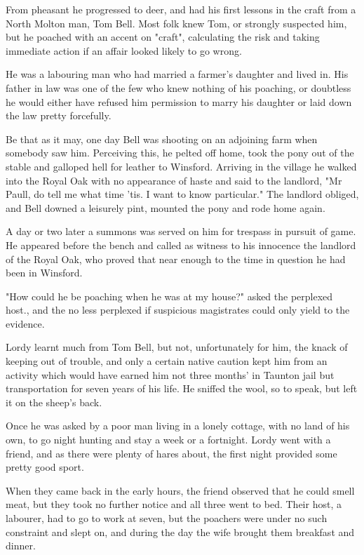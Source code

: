 From pheasant he progressed to deer, and had his first lessons in the craft from a North Molton man, Tom Bell. Most folk knew Tom, or strongly suspected him, but he poached with an accent on "craft", calculating the risk and taking immediate action if an affair looked likely to go wrong.

He was a labouring man who had married a farmer's daughter and lived in. His father in law was one of the few who knew nothing of his poaching, or doubtless he would either have refused him permission to marry his daughter or laid down the law pretty forcefully.

Be that as it may, one day Bell was shooting on an adjoining farm when somebody saw him. Perceiving this, he pelted off home, took the pony out of the stable and galloped hell for leather to Winsford. Arriving in the village he walked into the Royal Oak with no appearance of haste and said to the landlord, "Mr Paull, do tell me what time 'tis. I want to know particular." The landlord obliged, and Bell downed a leisurely pint, mounted the pony and rode home again.

A day or two later a summons was served on him for trespass in pursuit of game. He appeared before the bench and called as witness to his innocence the landlord of the Royal Oak, who proved that near enough to the time in question he had been in Winsford.

"How could he be poaching when he was at my house?" asked the perplexed host., and the no less perplexed if suspicious magistrates could only yield to the evidence.

Lordy learnt much from Tom Bell, but not, unfortunately for him, the knack of keeping out of trouble, and only a certain native caution kept him from an activity which would have earned him not three months' in Taunton jail but transportation for seven years of his life. He sniffed the wool, so to speak, but left it on the sheep's back.

Once he was asked by a poor man living in a lonely cottage, with no land of his own, to go night hunting and stay a week or a fortnight. Lordy went with a friend, and as there were plenty of hares about, the first night provided some pretty good sport.

When they came back in the early hours, the friend observed that he could smell meat, but they took no further notice and all three went to bed. Their host, a labourer, had to go to work at seven, but the poachers were under no such constraint and slept on, and during the day the wife brought them breakfast and dinner. 

